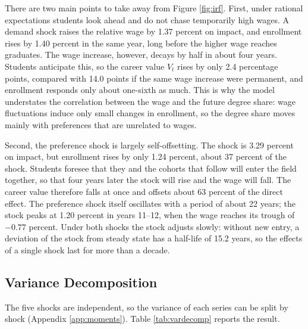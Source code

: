 \documentclass[12pt]{article}
\begin{document}
There are two main points to take away from Figure \ref{fig:irf}. First, under rational expectations students look ahead and do not chase temporarily high wages. A demand shock raises the relative wage by 1.37 percent on impact, and enrollment rises by 1.40 percent in the same year, long before the higher wage reaches graduates. The wage increase, however, decays by half in about four years. Students anticipate this, so the career value $V_t$ rises by only 2.4 percentage points, compared with 14.0 points if the same wage increase were permanent, and enrollment responds only about one-sixth as much. This is why the model understates the correlation between the wage and the future degree share: wage fluctuations induce only small changes in enrollment, so the degree share moves mainly with preferences that are unrelated to wages.

Second, the preference shock is largely self-offsetting. The shock is 3.29 percent on impact, but enrollment rises by only 1.24 percent, about 37 percent of the shock. Students foresee that they and the cohorts that follow will enter the field together, so that four years later the stock will rise and the wage will fall. The career value therefore falls at once and offsets about 63 percent of the direct effect. The preference shock itself oscillates with a period of about 22 years; the stock peaks at 1.20 percent in years 11--12, when the wage reaches its trough of $-0.77$ percent. Under both shocks the stock adjusts slowly: without new entry, a deviation of the stock from steady state has a half-life of 15.2 years, so the effects of a single shock last for more than a decade.

\subsection{Variance Decomposition}\label{sec:vardecomp}

The five shocks are independent, so the variance of each series can be split by shock (Appendix \ref{app:moments}). Table \ref{tab:vardecomp} reports the result.
\end{document}
